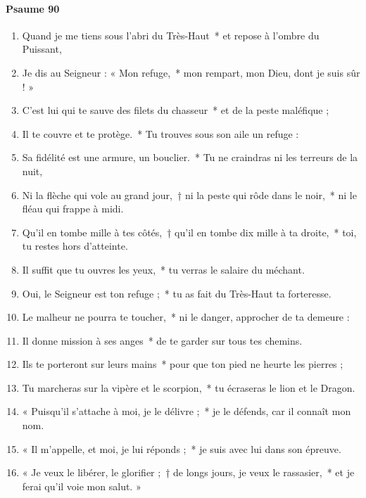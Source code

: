 \documentclass[twoside]{article}
\begin{document}
\begin{paracol}[1]{2}
\paragraph{Psaume 90}
\begin{enumerate}[wide, itemsep=0mm, labelwidth=!, labelindent=0pt, label=\color{gregoriocolor}\theenumi]
\item Quand je me tiens sous l'abri du Très-Haut~* et repose à l'ombre du Puissant,
\item Je dis au Seigneur : « Mon refuge,~* mon rempart, mon Dieu, dont je suis sûr ! »
\item C'est lui qui te sauve des filets du chasseur~* et de la peste maléfique ;
\item Il te couvre et te protège.~* Tu trouves sous son aile un refuge :
\item Sa fidélité est une armure, un bouclier.~* Tu ne craindras ni les terreurs de la nuit,
\item Ni la flèche qui vole au grand jour,~†  ni la peste qui rôde dans le noir,~* ni le fléau qui frappe à midi.
\item Qu'il en tombe mille à tes côtés,~† qu'il en tombe dix mille à ta droite,~* toi, tu restes hors d'atteinte.
\item Il suffit que tu ouvres les yeux,~* tu verras le salaire du méchant.
\item Oui, le Seigneur est ton refuge ;~* tu as fait du Très-Haut ta forteresse.
\item Le malheur ne pourra te toucher,~* ni le danger, approcher de ta demeure :
\item Il donne mission à ses anges~* de te garder sur tous tes chemins.
\item Ils te porteront sur leurs mains~* pour que ton pied ne heurte les pierres ;
\item Tu marcheras sur la vipère et le scorpion,~* tu écraseras le lion et le Dragon.
\item « Puisqu'il s'attache à moi, je le délivre ;~* je le défends, car il connaît mon nom.
\item « Il m'appelle, et moi, je lui réponds ;~* je suis avec lui dans son épreuve.
\item « Je veux le libérer, le glorifier ;~† de longs jours, je veux le rassasier,~* et je ferai qu'il voie mon salut. »
\end{enumerate}
\switchcolumn*


\end{paracol}
\end{document}
